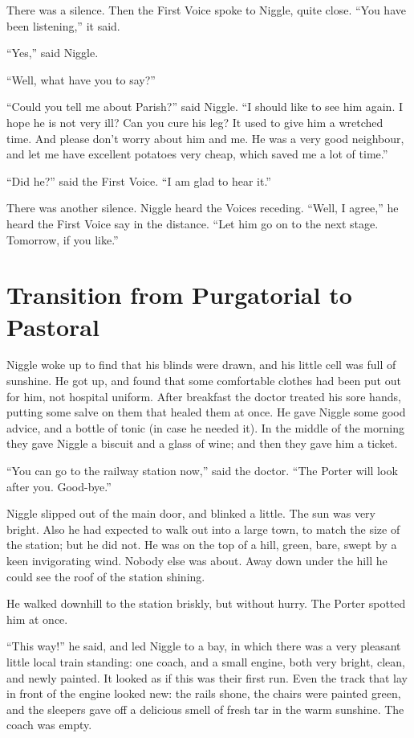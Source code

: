 There was a silence. Then the First Voice spoke to Niggle, quite close. “You have been listening,” it said.

“Yes,” said Niggle.

“Well, what have you to say?”

“Could you tell me about Parish?” said Niggle. “I should like to see him again. I hope he is not very ill? Can you cure his leg? It used to give him a wretched time. And please don’t worry about him and me. He was a very good neighbour, and let me have excellent potatoes very cheap, which saved me a lot of time.”

“Did he?” said the First Voice. “I am glad to hear it.”

There was another silence. Niggle heard the Voices receding. “Well, I agree,” he heard the First Voice say in the distance. “Let him go on to the next stage. Tomorrow, if you like.”

\onlyscore{\pagebreak}

\section*{Transition from Purgatorial to Pastoral}

Niggle woke up to find that his blinds were drawn, and his little cell was full of sunshine. He got up, and found that some comfortable clothes had been put out for him, not hospital uniform. After breakfast the doctor treated his sore hands, putting some salve on them that healed them at once. He gave Niggle some good advice, and a bottle of tonic (in case he needed it). In the middle of the morning they gave Niggle a biscuit and a glass of wine; and then they gave him a ticket.

“You can go to the railway station now,” said the doctor. “The Porter will look after you. Good-bye.”

Niggle slipped out of the main door, and blinked a little. The sun was very bright. Also he had expected to walk out into a large town, to match the size of the station; but he did not. He was on the top of a hill, green, bare, swept by a keen invigorating wind. Nobody else was about. Away down under the hill he could see the roof of the station shining.

He walked downhill to the station briskly, but without hurry. The Porter spotted him at once.

“This way!” he said, and led Niggle to a bay, in which there was a very pleasant little local train standing: one coach, and a small engine, both very bright, clean, and newly painted. It looked as if this was their first run. Even the track that lay in front of the engine looked new: the rails shone, the chairs were painted green, and the sleepers gave off a delicious smell of fresh tar in the warm sunshine. The coach was empty.


